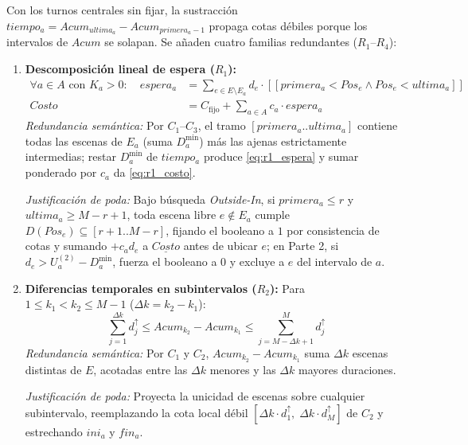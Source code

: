 Con los turnos centrales sin fijar, la sustracción $tiempo_a = Acum_{ultima_a} - Acum_{primera_a - 1}$ propaga cotas débiles porque los intervalos de $Acum$ se solapan. Se añaden cuatro familias redundantes ($R_1$--$R_4$):
\begin{enumerate}
    \item \textbf{Descomposición lineal de espera ($R_1$):}
    \begin{align}
        \forall a \in A \text{ con } K_a > 0: \quad
        espera_a &= \sum_{e \in E \setminus E_a} d_e \cdot [\![ primera_a < Pos_e \land Pos_e < ultima_a ]\!] \label{eq:r1_espera} \\
        Costo &= C_{\text{fijo}} + \sum_{a \in A} c_a \cdot espera_a \label{eq:r1_costo}
    \end{align}
    \emph{Redundancia semántica:} Por $C_1$--$C_3$, el tramo $[primera_a .. ultima_a]$ contiene todas las escenas de $E_a$ (suma $D^{\min}_a$) más las ajenas estrictamente intermedias; restar $D^{\min}_a$ de $tiempo_a$ produce \eqref{eq:r1_espera} y sumar ponderado por $c_a$ da \eqref{eq:r1_costo}.\par
    \emph{Justificación de poda:} Bajo búsqueda \emph{Outside-In}, si $primera_a \le r$ y $ultima_a \ge M - r + 1$, toda escena libre $e \notin E_a$ cumple $D(Pos_e) \subseteq [r+1 .. M-r]$, fijando el booleano a $1$ por consistencia de cotas y sumando $+c_a d_e$ a $\underline{Costo}$ antes de ubicar $e$; en Parte 2, si $d_e > U^{(2)}_a - D^{\min}_a$, fuerza el booleano a $0$ y excluye a $e$ del intervalo de $a$.

    \item \textbf{Diferencias temporales en subintervalos ($R_2$):} Para $1 \le k_1 < k_2 \le M - 1$ ($\Delta k = k_2 - k_1$):
    \begin{equation}
        \sum_{j=1}^{\Delta k} d^{\uparrow}_j \le Acum_{k_2} - Acum_{k_1} \le \sum_{j=M-\Delta k+1}^{M} d^{\uparrow}_j
        \label{eq:r2_subintervalos}
    \end{equation}
    \emph{Redundancia semántica:} Por $C_1$ y $C_2$, $Acum_{k_2} - Acum_{k_1}$ suma $\Delta k$ escenas distintas de $E$, acotadas entre las $\Delta k$ menores y las $\Delta k$ mayores duraciones.\par
    \emph{Justificación de poda:} Proyecta la unicidad de escenas sobre cualquier subintervalo, reemplazando la cota local débil $[\Delta k \cdot d^{\uparrow}_1,\; \Delta k \cdot d^{\uparrow}_M]$ de $C_2$ y estrechando $ini_a$ y $fin_a$.


\end{enumerate}
